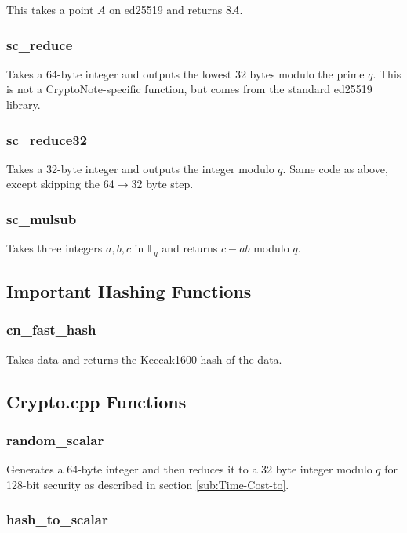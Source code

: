 \documentclass[12pt,english]{mrl}
\numberwithin{equation}{section}
\numberwithin{figure}{section}
\begin{document}
This takes a point $A$ on ed25519 and returns $8A$. 


\subsubsection{sc\_reduce}

Takes a 64-byte integer and outputs the lowest 32 bytes modulo the
prime $q$. This is not a CryptoNote-specific function, but comes
from the standard ed25519 library. 


\subsubsection{sc\_reduce32}

Takes a 32-byte integer and outputs the integer modulo $q$. Same
code as above, except skipping the 64$\to$32 byte step. 


\subsubsection{sc\_mulsub}

Takes three integers $a,b,c$ in $\mathbb{F}_{q}$ and returns $c-ab$
modulo $q$. 


\subsection{Important Hashing Functions}


\subsubsection{cn\_fast\_hash}

Takes data and returns the Keccak1600 hash of the data. 


\subsection{Crypto.cpp Functions }


\subsubsection{random\_scalar}

Generates a 64-byte integer and then reduces it to a 32 byte integer
modulo $q$ for 128-bit security as described in section \ref{sub:Time-Cost-to}. 


\subsubsection{hash\_to\_scalar}
\end{document}
